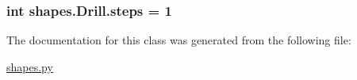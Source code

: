 \subsubsection[{steps}]{\setlength{\rightskip}{0pt plus 5cm}int shapes.\+Drill.\+steps = 1\hspace{0.3cm}{\ttfamily [static]}}\label{classshapes_1_1_drill_a05155870584a057702ebfe0ad574a8bb}


The documentation for this class was generated from the following file\+:\begin{DoxyCompactItemize}
\item 
\hyperlink{shapes_8py}{shapes.\+py}\end{DoxyCompactItemize}

